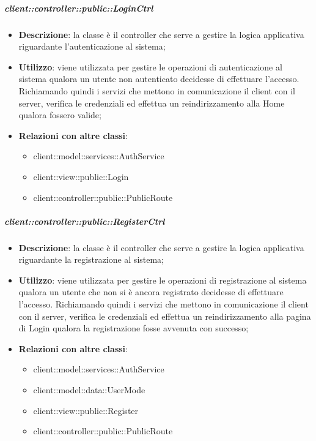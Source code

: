 		\subparagraph{client::controller::public::LoginCtrl} %
		\label{subp:bdsm_app_client_controller_public_loginctrl}
			\begin{itemize}
				\item \textbf{Descrizione}: la classe è il controller che serve a gestire la logica applicativa riguardante l'autenticazione al sistema;
				\item \textbf{Utilizzo}: viene utilizzata per gestire le operazioni di autenticazione al sistema qualora un utente non autenticato decidesse di effettuare l'accesso. Richiamando quindi i servizi che mettono in comunicazione il client con il server, verifica le credenziali ed effettua un reindirizzamento alla Home qualora fossero valide;
				\item \textbf{Relazioni con altre classi}:
					\begin{itemize}
						\item client::model::services::AuthService
						\item client::view::public::Login
						\item client::controller::public::PublicRoute
					\end{itemize}
			\end{itemize}

		\subparagraph{client::controller::public::RegisterCtrl} %
		\label{subp:bdsm_app_client_controller_public_registerctrl}
			\begin{itemize}
				\item \textbf{Descrizione}: la classe è il controller che serve a gestire la logica applicativa riguardante la registrazione al sistema;
				\item \textbf{Utilizzo}: viene utilizzata per gestire le operazioni di registrazione al sistema qualora un utente che non si è ancora registrato decidesse di effettuare l'accesso. Richiamando quindi i servizi che mettono in comunicazione il client con il server, verifica le credenziali ed effettua un reindirizzamento alla pagina di Login qualora la registrazione fosse avvenuta con successo;
				\item \textbf{Relazioni con altre classi}:
					\begin{itemize}
						\item client::model::services::AuthService
						\item client::model::data::UserMode
						\item client::view::public::Register
						\item client::controller::public::PublicRoute
					\end{itemize}
			\end{itemize}

